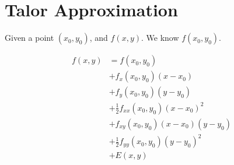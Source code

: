 \section{Talor Approximation}

  Given a point $ \left( x_{0}, y_{0} \right) $, and
  $ f\left( x, y \right) $. We know $ f\left( x_{0}, y_{0} \right) $.

  \begin{align*}
    f\left( x, y \right)
      &= f\left( x_{0}, y_{0} \right) \\
      &+ f_{x}\left( x_{0}, y_{0} \right)\left( x - x_{0} \right) \\
      &+ f_{y}\left( x_{0}, y_{0} \right)\left( y - y_{0} \right) \\
      &+ \frac{1}{2} f_{xx}\left( x_{0}, y_{0} \right)\left( x - x_{0} \right)^{2} \\
      &+ f_{xy}\left( x_{0}, y_{0} \right)\left( x - x_{0} \right) \left( y - y_{0} \right) \\
      &+ \frac{1}{2} f_{yy}\left( x_{0}, y_{0} \right)\left( y - y_{0} \right)^{2} \\
      &+ E\left( x, y \right)
  \end{align*}